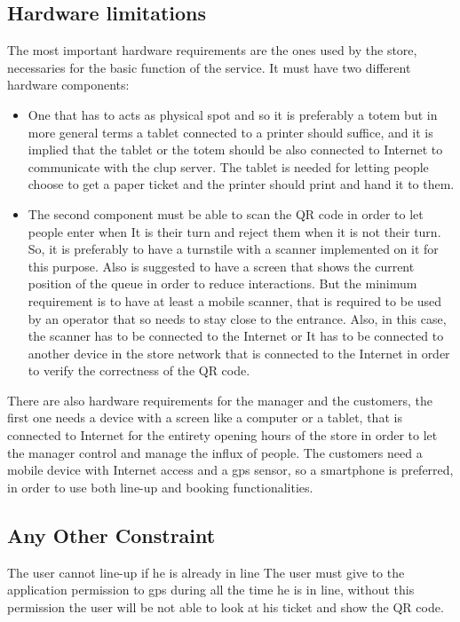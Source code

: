 \subsection{Hardware limitations}

The most important hardware requirements are the ones used by the store, necessaries for the basic function of the service. It must have two different hardware components:
\begin{itemize}
	\item One that has to acts as physical spot and so it is preferably a totem but in more general terms a tablet connected to a printer should suffice, and it is implied that the tablet or the totem should be also connected to Internet to communicate with the \gls{clup} server. The tablet is needed for letting people choose to get a paper ticket and the printer should print and hand it to them.

	\item The second component must be able to scan the QR code in order to let people enter when It is their turn and reject them when it is not their turn. So, it is preferably to have a turnstile with a scanner implemented on it for this purpose. Also is suggested to have a screen that shows the current position of the queue in order to reduce interactions. But the minimum requirement is to have at least a mobile scanner, that is  required to be used by an operator that so needs to stay close to the entrance. Also, in this case, the scanner has to be connected to the Internet or It has to be connected to another device in the store network that is connected to the Internet in order to verify the correctness of the QR code. 

\end{itemize}

There are also hardware requirements for the manager and the customers, the first one needs a device with a screen like a computer or a tablet, that is connected to Internet for the entirety opening hours of the store in order to let the manager control and manage the influx of people. The customers need a mobile device with Internet access and a \gls{gps} sensor, so a smartphone is preferred, in order to use both line-up and booking functionalities. 

\subsection{Any Other Constraint}

The user cannot line-up if he is already in line
 The user must give to the application permission to \gls{gps} during all the time he is in line, without this permission the user will be not able to look at his ticket and show the QR code.


